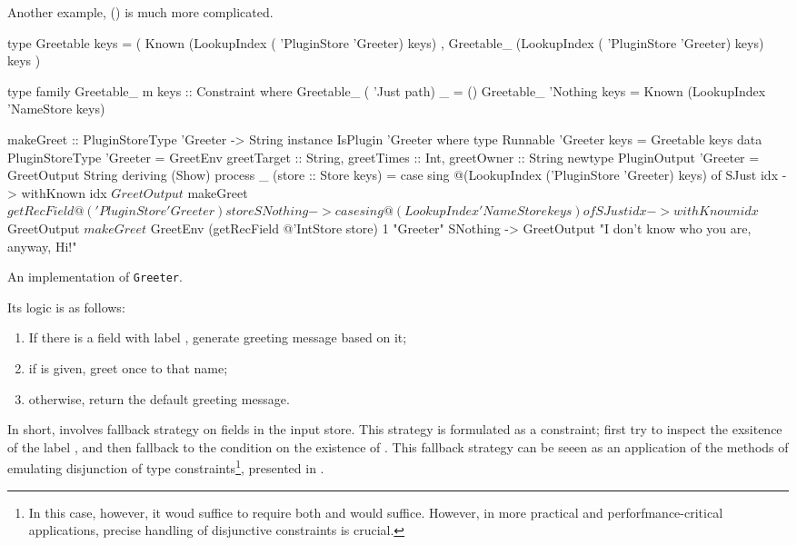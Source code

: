 \documentclass[demotion-paper.tex]{subfiles}
\begin{document}
Another example,  () is much more complicated.
\begin{listing}
\begin{code}
type Greetable keys =
  ( Known (LookupIndex ( 'PluginStore 'Greeter) keys)
  , Greetable_ (LookupIndex ( 'PluginStore 'Greeter) keys) keys
  )

type family Greetable_ m keys :: Constraint where
  Greetable_ ( 'Just path) _ = ()
  Greetable_ 'Nothing keys = Known (LookupIndex 'NameStore keys)

makeGreet :: PluginStoreType 'Greeter -> String
instance IsPlugin 'Greeter where
  type Runnable 'Greeter keys = Greetable keys
  data PluginStoreType 'Greeter = GreetEnv
    { greetTarget :: String, greetTimes :: Int, greetOwner :: String }
  newtype PluginOutput 'Greeter = GreetOutput String deriving (Show)
  process _ (store :: Store keys) =
    case sing @(LookupIndex ('PluginStore 'Greeter) keys) of
      SJust idx -> withKnown idx $ GreetOutput $
        makeGreet $ getRecField @('PluginStore 'Greeter) store
      SNothing -> case sing @(LookupIndex 'NameStore keys) of
        SJust idx -> withKnown idx $ GreetOutput $ makeGreet $
          GreetEnv (getRecField @'IntStore store) 1 "Greeter"
        SNothing -> GreetOutput "I don't know who you are, anyway, Hi!"
\end{code}
\caption{An implementation of \texttt{Greeter}.}
\label{lst:plugin-greet}
\end{listing}
Its logic is as follows:
\begin{enumerate}
  \item If there is a field with label , generate greeting message based on it;
  \item if  is given, greet once to that name;
  \item otherwise, return the default greeting message.
\end{enumerate}
In short,  involves fallback strategy on fields in the input store.
This strategy is formulated as a  constraint; first try to inspect the exsitence of the label , and then fallback to the condition on the existence of .
This fallback strategy can be seeen as an application of the methods of emulating disjunction of type constraints\footnote{%
In this case, however, it woud suffice to require both  and  would suffice. However, in more practical and perforfmance-critical applications, precise handling of disjunctive constraints is crucial.},
presented in .
\end{document}
